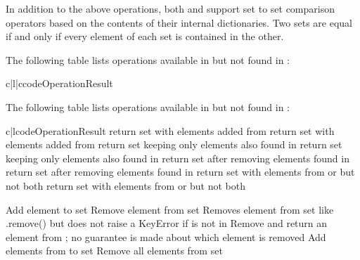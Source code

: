 In addition to the above operations, both  and 
support set to set comparison operators based on the contents of their
internal dictionaries.  Two sets are equal if and only if every element of
each set is contained in the other.

The following table lists operations available in 
but not found in :

\begin{tableii}{c|l|c}{code}{Operation}{Result}
\end{tableii}

The following table lists operations available in 
but not found in :

\begin{tableii}{c|l}{code}{Operation}{Result}
         {return set  with elements added from }
         {return set  with elements added from }
         {return set  keeping only elements also found in }
         {return set  keeping only elements also found in }
         {return set  after removing elements found in }
         {return set  after removing elements found in }
         {return set  with elements from  or 
          but not both}
         {return set  with elements from  or 
          but not both}

  \hline
         {Add element  to set }
         {Remove element  from set }
         {Removes element  from set  like .remove()
          but does not raise a KeyError if  is not in }
         {Remove and return an element from ; no guarantee is
          made about which element is removed}
         {Add elements from  to set }
         {Remove all elements from set }
\end{tableii}


